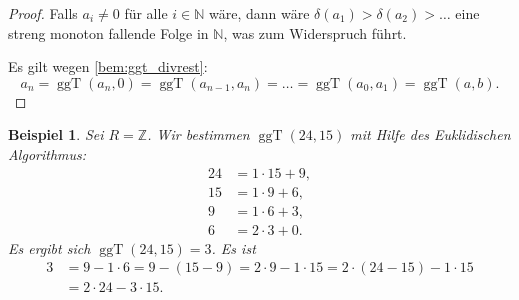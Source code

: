 \documentclass[a4paper, twoside, 11pt, ngerman]{report}
\newcommand{\NN}{\mathds N}
\newcommand{\ZZ}{\mathds Z}
\DeclareMathOperator{\ggT}{ggT}
\theoremstyle{definistyle}
\newtheorem{bsp}[satz]{Beispiel}
\theoremstyle{remark}
\begin{document}
\begin{proof}
Falls $a_i \neq 0$ für alle $i \in \NN$ wäre, dann wäre $\delta(a_1) > \delta(a_2) > \dots$ eine streng monoton fallende Folge in $\NN$, was zum Widerspruch führt.

Es gilt wegen \ref{bem:ggt_divrest}:
\[
a_n = \ggT(a_n, 0) = \ggT(a_{n-1}, a_n) = \dots = \ggT(a_0, a_1) = \ggT(a, b).
\]
\end{proof}

\begin{bsp}\label{bsp:ggt_euklidischer_algorithmus}
Sei $R = \ZZ$. Wir bestimmen $\ggT(24,15)$ mit Hilfe des Euklidischen Algorithmus:
\begin{align*}
24 &= 1 \cdot 15 + 9, \\
15 &= 1 \cdot 9 + 6, \\
9 &= 1 \cdot 6 + 3, \\
6 &= 2 \cdot 3 + 0.
\end{align*}
Es ergibt sich $\ggT(24, 15) = 3$.
Es ist
\begin{align*}
3 &= 9 - 1 \cdot 6 = 9 - (15 - 9) = 2 \cdot 9 - 1 \cdot 15= 2 \cdot (24 - 15) - 1 \cdot 15 \\
&= 2 \cdot 24 - 3 \cdot 15.
\end{align*}
\end{bsp}
\end{document}

